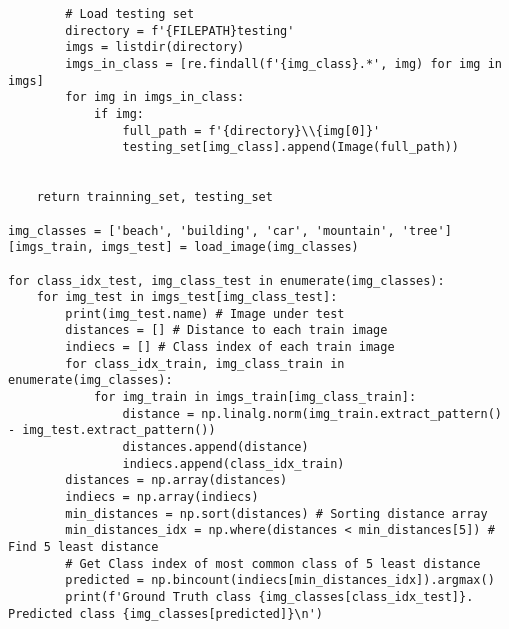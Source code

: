 \documentclass[11pt]{article}
\begin{document}
\begin{lstlisting}
        # Load testing set
        directory = f'{FILEPATH}testing'
        imgs = listdir(directory)
        imgs_in_class = [re.findall(f'{img_class}.*', img) for img in imgs]
        for img in imgs_in_class:
            if img:
                full_path = f'{directory}\\{img[0]}'
                testing_set[img_class].append(Image(full_path))
        

    return trainning_set, testing_set

img_classes = ['beach', 'building', 'car', 'mountain', 'tree']
[imgs_train, imgs_test] = load_image(img_classes)

for class_idx_test, img_class_test in enumerate(img_classes):
    for img_test in imgs_test[img_class_test]:
        print(img_test.name) # Image under test
        distances = [] # Distance to each train image
        indiecs = [] # Class index of each train image
        for class_idx_train, img_class_train in enumerate(img_classes):
            for img_train in imgs_train[img_class_train]:
                distance = np.linalg.norm(img_train.extract_pattern() - img_test.extract_pattern())
                distances.append(distance)
                indiecs.append(class_idx_train)
        distances = np.array(distances)
        indiecs = np.array(indiecs)
        min_distances = np.sort(distances) # Sorting distance array
        min_distances_idx = np.where(distances < min_distances[5]) # Find 5 least distance
        # Get Class index of most common class of 5 least distance
        predicted = np.bincount(indiecs[min_distances_idx]).argmax()  
        print(f'Ground Truth class {img_classes[class_idx_test]}. Predicted class {img_classes[predicted]}\n')


\end{lstlisting}

\end{document}
